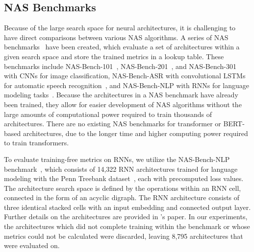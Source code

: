 \documentclass[11pt]{article}
\begin{document}
\subsection{NAS Benchmarks}
    Because of the large search space for neural architectures, it is challenging to have direct comparisons between various NAS algorithms. A series of NAS benchmarks~\cite{mehta_nas-bench-suite_2022} have been created, which evaluate a set of architectures within a given search space and store the trained metrics in a lookup table. These benchmarks include NAS-Bench-101~\cite{ying_nas-bench-101_2019}, NAS-Bench-201~\cite{dong_nas-bench-201_2020}, and NAS-Bench-301~\cite{siems_nas-bench-301_2021} with CNNs for image classification, NAS-Bench-ASR with convolutional LSTMs for automatic speech recognition~\cite{mehrotra_nas-bench-asr_2021}, and NAS-Bench-NLP with RNNs for language modeling tasks~\cite{klyuchnikov_nas-bench-nlp_2022}. Because the architectures in a NAS benchmark have already been trained, they allow for easier development of NAS algorithms without the large amounts of computational power required to train thousands of architectures. There are no existing NAS benchmarks for transformer or BERT-based architectures, due to the longer time and higher computing power required to train transformers.

    To evaluate training-free metrics on RNNs, we utilize the NAS-Bench-NLP benchmark~\cite{klyuchnikov_nas-bench-nlp_2022}, which consists of 14,322 RNN architectures trained for language modeling with the Penn Treebank dataset~\cite{marcus_building_1993}, each with precomputed loss values. The architecture search space is defined by the operations within an RNN cell, connected in the form of an acyclic digraph. The RNN architecture consists of three identical stacked cells with an input embedding and connected output layer. Further details on the architectures are provided in \citeauthor{klyuchnikov_nas-bench-nlp_2022}'s paper. In our experiments, the architectures which did not complete training within the benchmark or whose metrics could not be calculated were discarded, leaving 8,795 architectures that were evaluated on.
\end{document}
